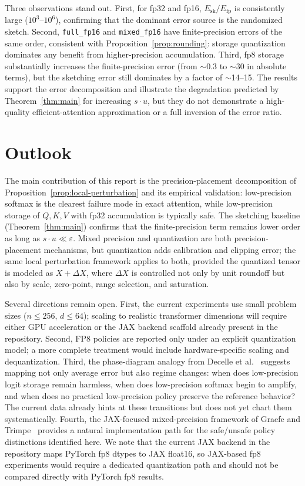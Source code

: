 Three observations stand out. First, for fp32 and fp16, $E_{\mathrm{sk}} / E_{\mathrm{fp}}$ is consistently large ($10^3$--$10^6$), confirming that the dominant error source is the randomized sketch. Second, \texttt{full\_fp16} and \texttt{mixed\_fp16} have finite-precision errors of the same order, consistent with Proposition~\ref{prop:rounding}: storage quantization dominates any benefit from higher-precision accumulation. Third, fp8 storage substantially increases the finite-precision error (from $\sim$0.3 to $\sim$30 in absolute terms), but the sketching error still dominates by a factor of $\sim$14--15. The results support the error decomposition and illustrate the degradation predicted by Theorem~\ref{thm:main} for increasing $s \cdot u$, but they do not demonstrate a high-quality efficient-attention approximation or a full inversion of the error ratio.

\section{Outlook}

The main contribution of this report is the precision-placement decomposition of Proposition~\ref{prop:local-perturbation} and its empirical validation: low-precision softmax is the clearest failure mode in exact attention, while low-precision storage of $Q,K,V$ with fp32 accumulation is typically safe. The sketching baseline (Theorem~\ref{thm:main}) confirms that the finite-precision term remains lower order as long as $s \cdot u \ll \varepsilon$. Mixed precision and quantization are both precision-placement mechanisms, but quantization adds calibration and clipping error; the same local perturbation framework applies to both, provided the quantized tensor is modeled as $X + \Delta X$, where $\Delta X$ is controlled not only by unit roundoff but also by scale, zero-point, range selection, and saturation.

Several directions remain open. First, the current experiments use small problem sizes ($n \leq 256$, $d \leq 64$); scaling to realistic transformer dimensions will require either GPU acceleration or the JAX backend scaffold already present in the repository. Second, FP8 policies are reported only under an explicit quantization model; a more complete treatment would include hardware-specific scaling and dequantization. Third, the phase-diagram analogy from Decelle et al.~\autocite{DecelleEtAl2011} suggests mapping not only average error but also regime changes: when does low-precision logit storage remain harmless, when does low-precision softmax begin to amplify, and when does no practical low-precision policy preserve the reference behavior? The current data already hints at these transitions but does not yet chart them systematically. Fourth, the JAX-focused mixed-precision framework of Graefe and Trimpe~\autocite{GraefeTrimpe2025} provides a natural implementation path for the safe/unsafe policy distinctions identified here. We note that the current JAX backend in the repository maps PyTorch fp8 dtypes to JAX float16, so JAX-based fp8 experiments would require a dedicated quantization path and should not be compared directly with PyTorch fp8 results.

